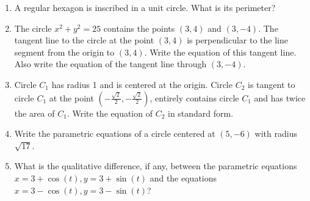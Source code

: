 \documentclass[
]{article}
\begin{document}
\begin{enumerate}
\item
  A regular hexagon is inscribed in a unit circle. What is its
  perimeter?
\item
  The circle \(x^2 + y^2 = 25\) contains the points \((3,4)\) and
  \((3,-4)\). The tangent line to the circle at the point \((3,4)\) is
  perpendicular to the line segment from the origin to \((3,4)\). Write
  the equation of this tangent line. Also write the equation of the
  tangent line through \((3,-4)\).
\item
  Circle \(C_1\) has radius 1 and is centered at the origin. Circle
  \(C_2\) is tangent to circle \(C_1\) at the point
  \((-\frac{\sqrt2}{2},-\frac{\sqrt2}{2})\), entirely contains circle
  \(C_1\) and has twice the area of \(C_1\). Write the equation of
  \(C_2\) in standard form.
\item
  Write the parametric equations of a circle centered at \((5,-6)\) with
  radius \(\sqrt{17}\).
\item
  What is the qualitative difference, if any, between the parametric
  equations \(x = 3 + \cos(t), y = 3 + \sin(t)\) and the equations
  \(x = 3-\cos(t), y=3-\sin(t)\)?
\end{enumerate}
\end{document}
